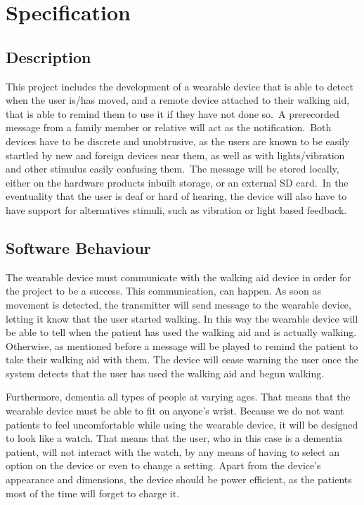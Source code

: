 \chapter{Specification}\label{ch:specification}
    \section{Description}

        This project includes the development of a wearable device that is able to detect when the user is/has moved,
        and a remote device attached to their walking aid, that is able to remind them to use it if they have not done
        so.\ A prerecorded message from a family member or relative will act as the notification.\ Both devices have to
        be discrete and unobtrusive, as the users are known to be easily startled by new and foreign devices near them,
        as well as with lights/vibration and other stimulus easily confusing them.\ The message will be stored locally,
        either on the hardware products inbuilt storage, or an external SD card.\ In the eventuality that the user is
        deaf or hard of hearing, the device will also have to have support for alternatives stimuli, such as vibration
        or light based feedback.

    \section{Software Behaviour}

        The wearable device must communicate with the walking aid device in order for the project to be a success. This
        communication, can happen. As soon as movement is detected, the transmitter will
        send message to the wearable device, letting it know that the user started walking. In this way the wearable
        device will be able to tell when the patient has used the walking aid and is actually walking. Otherwise, as
        mentioned before a message will be played to remind the patient to take their walking aid with them. The device
        will cease warning the user once the system detects that the user has used the walking aid and begun walking.

        Furthermore, dementia all types of people at varying ages. That means that the wearable device must be able to
        fit on anyone's wrist. Because we do not want patients to feel uncomfortable while using the wearable device, it
        will be designed to look like a watch. That means that the user, who in this case is a dementia patient, will
        not interact with the watch, by any means of having to select an option on the device or even to change a
        setting. Apart from the device's appearance and dimensions, the device should be power efficient, as the
        patients most of the time will forget to charge it.

